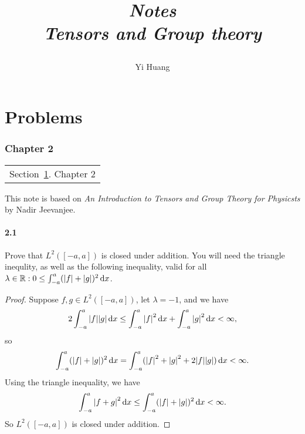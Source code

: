 \documentclass[10pt]{article}
\title{\begin{center}{\Huge \textit{Notes}}\\{{\itshape Tensors and Group theory}}\end{center}}
\author{Yi Huang}
\affiliation{
University of Minnesota
}
\begin{document}
	\maketitle
	\flushbottom
	\newpage
	\pagestyle{fancynotes}
	\part{Problems}
	\section{Chapter 2}\label{chp: 2}
	\begin{margintable}\vspace{.8in}\footnotesize
		\begin{tabularx}{\marginparwidth}{|X}
		Section~\ref{chp: 2}. Chapter 2\\
		\end{tabularx}
	\end{margintable}

	This note is based on \textit{An Introduction to Tensors and Group Theory for Physicsts} by Nadir Jeevanjee.

\subsection{2.1}
Prove that $L^2([-a,a])$ is closed under addition. You will need the triangle inequlity, as well as the following inequality, valid for all $\lambda \in \mathbb{R}: 0 \le \int_{-a}^a (\abs{f} + \abs{g})^2 \dd{x}$.

\begin{proof}
	Suppose $f,g \in L^2([-a,a])$, let $\lambda = -1$, and we have
	\begin{equation}
		2\int_{-a}^a \abs{f}\abs{g} \dd{x} \le \int_{-a}^a \abs{f}^2 \dd{x} + \int_{-a}^a \abs{g}^2 \dd{x} < \infty,
	\end{equation}
	so
	\begin{equation}
		\int_{-a}^a (\abs{f} + \abs{g})^2 \dd{x} = \int_{-a}^a (\abs{f}^2 + \abs{g}^2 + 2\abs{f}\abs{g}) \dd{x} < \infty.
	\end{equation}
	Using the triangle inequality, we have
	\begin{equation}
		\int_{-a}^a \abs{f+g}^2 \dd{x} \le \int_{-a}^a (\abs{f} + \abs{g})^2 \dd{x} < \infty.
	\end{equation}
	So $L^2([-a,a])$ is closed under addition.
\end{proof}
\end{document}
